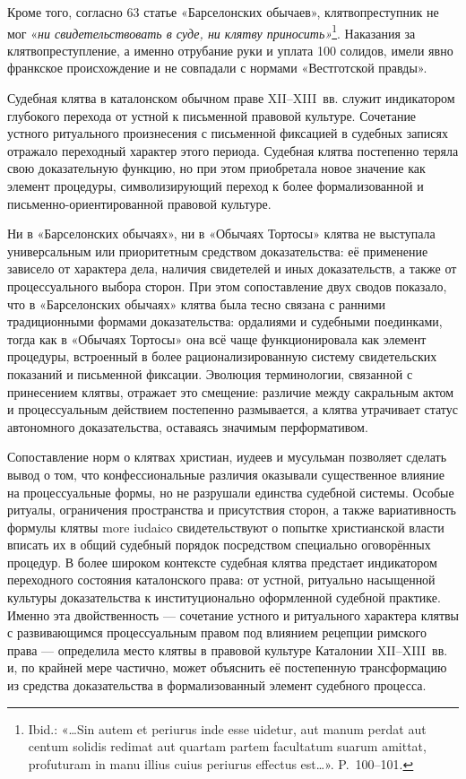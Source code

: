 Кроме того, согласно 63 статье «Барселонских обычаев», клятвопреступник не мог «\emph{ни свидетельствовать в суде, ни клятву приносить»}\footnote{Ibid.: «…Sin autem et periurus inde esse uidetur, aut manum perdat aut centum solidis redimat aut quartam partem facultatum suarum amittat, profuturam in manu illius cuius periurus effectus est…». P.~100--101.}. Наказания за клятвопреступление, а именно отрубание руки и уплата 100 солидов, имели явно франкское происхождение и не совпадали с нормами «Вестготской правды».

Судебная клятва в каталонском обычном праве XII--XIII~вв. служит индикатором глубокого перехода от устной к письменной правовой культуре. Сочетание устного ритуального произнесения с письменной фиксацией в судебных записях отражало переходный характер этого периода. Судебная клятва постепенно теряла свою доказательную функцию, но при этом приобретала новое значение как элемент процедуры, символизирующий переход к более формализованной и письменно-ориентированной правовой культуре.

Ни в «Барселонских обычаях», ни в «Обычаях Тортосы» клятва не выступала универсальным или приоритетным средством доказательства: её применение зависело от характера дела, наличия свидетелей и иных доказательств, а также от процессуального выбора сторон. При этом сопоставление двух сводов показало, что в «Барселонских обычаях» клятва была тесно связана с ранними традиционными формами доказательства: ордалиями и судебными поединками, тогда как в «Обычаях Тортосы» она всё чаще функционировала как элемент процедуры, встроенный в более рационализированную систему свидетельских показаний и письменной фиксации. Эволюция терминологии, связанной с принесением клятвы, отражает это смещение: различие между сакральным актом и процессуальным действием постепенно размывается, а клятва утрачивает статус автономного доказательства, оставаясь значимым перформативом.

Сопоставление норм о клятвах христиан, иудеев и мусульман позволяет сделать вывод о том, что конфессиональные различия оказывали существенное влияние на процессуальные формы, но не разрушали единства судебной системы. Особые ритуалы, ограничения пространства и присутствия сторон, а также вариативность формулы клятвы more iudaico свидетельствуют о попытке христианской власти вписать их в общий судебный порядок посредством специально оговорённых процедур. В более широком контексте судебная клятва предстает индикатором переходного состояния каталонского права: от устной, ритуально насыщенной культуры доказательства к институционально оформленной судебной практике. Именно эта двойственность --- сочетание устного и ритуального характера клятвы с развивающимся процессуальным правом под влиянием рецепции римского права --- определила место клятвы в правовой культуре Каталонии XII--XIII~вв. и, по крайней мере частично, может объяснить её постепенную трансформацию из средства доказательства в формализованный элемент судебного процесса.

